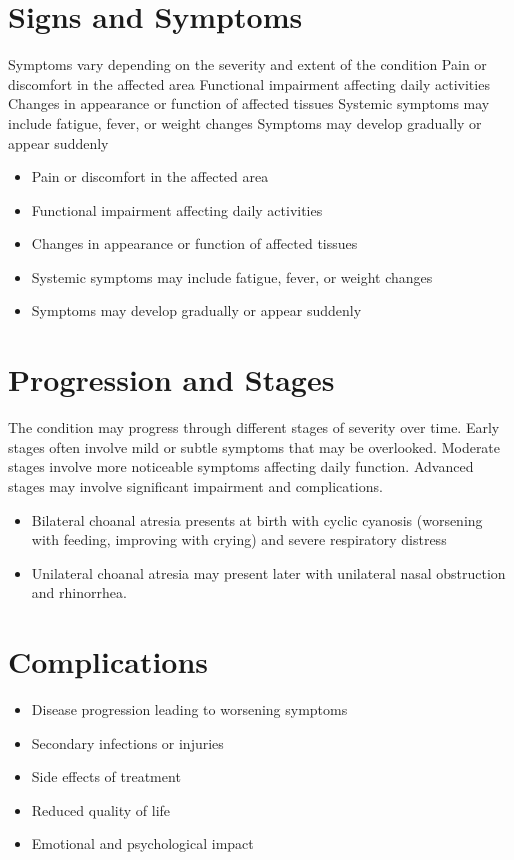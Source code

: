\section{Signs and Symptoms}
Symptoms vary depending on the severity and extent of the condition Pain or discomfort in the affected area Functional impairment affecting daily activities Changes in appearance or function of affected tissues Systemic symptoms may include fatigue, fever, or weight changes Symptoms may develop gradually or appear suddenly

\begin{itemize}[noitemsep]
  \item Pain or discomfort in the affected area
  \item Functional impairment affecting daily activities
  \item Changes in appearance or function of affected tissues
  \item Systemic symptoms may include fatigue, fever, or weight changes
  \item Symptoms may develop gradually or appear suddenly
\end{itemize}
\section{Progression and Stages}
The condition may progress through different stages of severity over time. Early stages often involve mild or subtle symptoms that may be overlooked. Moderate stages involve more noticeable symptoms affecting daily function. Advanced stages may involve significant impairment and complications.

\begin{itemize}[noitemsep]
  \item Bilateral choanal atresia presents at birth with cyclic cyanosis (worsening with feeding, improving with crying) and severe respiratory distress
  \item Unilateral choanal atresia may present later with unilateral nasal obstruction and rhinorrhea.
\end{itemize}
\section{Complications}
\begin{itemize}[noitemsep]
  \item Disease progression leading to worsening symptoms
  \item Secondary infections or injuries
  \item Side effects of treatment
  \item Reduced quality of life
  \item Emotional and psychological impact
\end{itemize}
